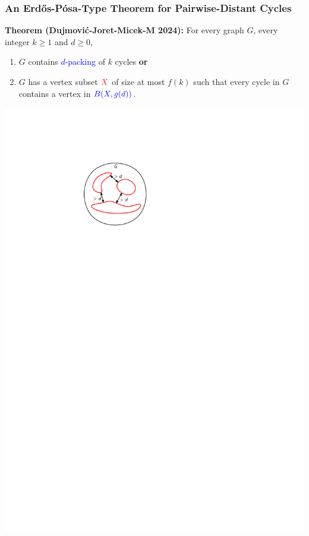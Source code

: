 \documentclass{beamer}
\begin{document}
\begin{frame}
  \frametitle{An Erdős-Pósa-Type Theorem for Pairwise-Distant Cycles}

  \noindent\textbf{Theorem (Dujmović-Joret-Micek-M 2024):} For every graph $G$, every integer $k\ge 1$ and $d\ge 0$,
  \begin{enumerate}%
    \item $G$ contains \textcolor{blue}{$d$-packing} of $k$ cycles \textbf{or}
    \item $G$ has a vertex subset $\mathcolor{red}{X}$ of size at most $f(k)$ such that every cycle in $G$ contains a vertex in $\mathcolor{blue}{B(X, g(d))}$.
  \end{enumerate}

  \begin{center}
    \includegraphics[page=1]{figs/cep}

\end{center}
\end{frame}
\end{document}
